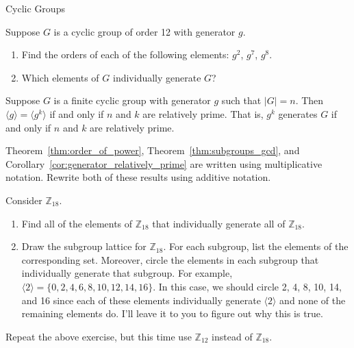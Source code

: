 \begin{section}{Cyclic Groups}
\begin{problem}
Suppose $G$ is a cyclic group of order 12 with generator $g$. 
\begin{enumerate}[label=\textrm{(\alph*)}]
\item Find the orders of each of the following elements: $g^2$, $g^7$, $g^8$.
\item Which elements of $G$ individually generate $G$?
\end{enumerate}
\end{problem}

\begin{corollary}\label{cor:generator_relatively_prime}
Suppose $G$ is a finite cyclic group with generator $g$ such that $|G|=n$. Then $\langle g\rangle=\langle g^k\rangle$ if and only if $n$ and $k$ are relatively prime. That is, $g^k$ generates $G$ if and only if $n$ and $k$ are relatively prime.
\end{corollary}

\begin{problem}
Theorem~\ref{thm:order_of_power}, Theorem~\ref{thm:subgroups_gcd}, and Corollary~\ref{cor:generator_relatively_prime} are written using multiplicative notation.  Rewrite both of these results using additive notation.
\end{problem}

\begin{problem}
Consider $\mathbb{Z}_{18}$.
\begin{enumerate}[label=\textrm{(\alph*)}]
\item Find all of the elements of $\mathbb{Z}_{18}$ that individually generate all of $\mathbb{Z}_{18}$.
\item Draw the subgroup lattice for $\mathbb{Z}_{18}$. For each subgroup, list the elements of the corresponding set.  Moreover, circle the elements in each subgroup that individually generate that subgroup.  For example, $\langle 2\rangle=\{0,2,4,6,8,10,12,14,16\}$. In this case, we should circle 2, 4, 8, 10, 14, and 16 since each of these elements individually generate $\langle 2\rangle$ and none of the remaining elements do.  I'll leave it to you to figure out why this is true.
\end{enumerate}
\end{problem}

\begin{problem}
Repeat the above exercise, but this time use $\mathbb{Z}_{12}$ instead of $\mathbb{Z}_{18}$.
\end{problem}


\end{section}
